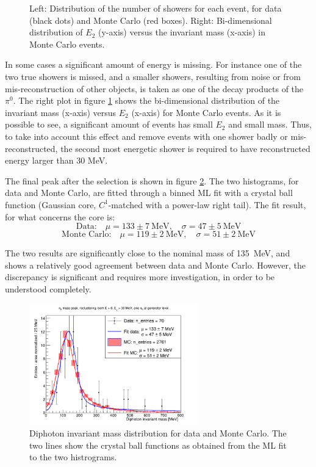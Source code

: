 \begin{figure}[!htbp]
\begin{minipage}{0.49\columnwidth}
\end{minipage}
\caption{Left: Distribution of the number of showers for each event, for data (black dots) and Monte Carlo (red boxes). Right: Bi-dimensional distribution of $E_2$ (y-axis) versus the invariant mass (x-axis) in Monte Carlo events.}
\label{fig:mc_mass_e2}
\end{figure}

In some cases a significant amount of energy is missing. For instance one of the two true showers is missed, and a smaller showers, resulting from noise or from mis-reconstruction of other objects, is taken as one of the decay products of the $\pi^0$. The right plot in figure \ref{fig:mc_mass_e2} shows the bi-dimensional distribution of the invariant mass (x-axis) versus $E_2$ (x-axis) for Monte Carlo events. As it is possible to see, a significant amount of events has small $E_2$ and small mass. Thus, to take into account this effect and remove events with one shower badly or mis-reconstructed, the second most energetic shower is required to have reconstructed energy larger than 30 MeV.

The final peak after the selection is shown in figure \ref{fig:pi0_mass_peak}. The two histograms, for data and Monte Carlo, are fitted through a binned ML fit with a crystal ball function (Gaussian core, $C^1$-matched with a power-law right tail). The fit result, for what concerns the core is:
\[ \text{Data:} \quad \mu = 133 \pm 7~\text{MeV}, \quad \sigma = 47 \pm 5~\text{MeV} \]
\[ \text{Monte Carlo:} \quad \mu = 119 \pm 2~\text{MeV}, \quad \sigma = 51 \pm 2~\text{MeV} \]

The two results are significantly close to the nominal mass of 135~MeV, and shows a relatively good agreement between data and Monte Carlo. However, the discrepancy is significant and requires more investigation, in order to be understood completely.

\begin{figure}[htbp]
\centering
\includegraphics[width=0.65\textwidth]{_fig/data_mc_pi0_mass_peak_crb_cut_on_second_shower.png}
\caption{Diphoton invariant mass distribution for data and Monte Carlo. The two lines show the crystal ball functions as obtained from the ML fit to the two histrograms.} 
\label{fig:pi0_mass_peak}
\end{figure}

